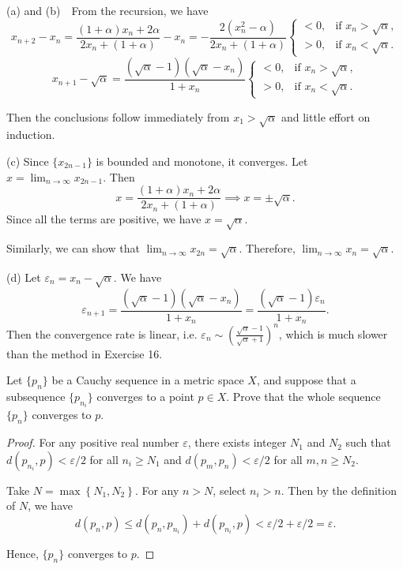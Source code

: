 \documentclass{article}
\begin{document}
\begin{solution}
	(a) and (b)\ \ From the recursion, we have
	\[ x_{n+2}-x_{n}=\frac{(1+\alpha)x_{n}+2\alpha}{2x_n+(1+\alpha)}-x_n=-\frac{2(x_n^2-\alpha)}{2x_n+(1+\alpha)}\begin{cases}
		<0, & \text{if } x_n>\sqrt{\alpha},\\
		>0, & \text{if } x_n<\sqrt{\alpha}.
	\end{cases} \]
	\[ x_{n+1}-\sqrt{\alpha}=\frac{(\sqrt{\alpha}-1)(\sqrt{\alpha}-x_n)}{1+x_n}\begin{cases}
		<0, & \text{if } x_n>\sqrt{\alpha},\\
		>0, & \text{if } x_n<\sqrt{\alpha}.
	\end{cases} \] \par
	Then the conclusions follow immediately from \( x_1>\sqrt{\alpha} \) and little effort on induction.\par
	(c) Since \( \{x_{2n-1}\} \) is bounded and monotone, it converges. Let \( x=\lim_{n\to\infty} x_{2n-1} \). Then
	\[ x=\frac{(1+\alpha)x_{n}+2\alpha}{2x_n+(1+\alpha)} \implies x=\pm\sqrt{\alpha}. \] 
	Since all the terms are positive, we have \( x=\sqrt{\alpha} \).\par
	Similarly, we can show that \( \lim_{n\to\infty} x_{2n}=\sqrt{\alpha} \). Therefore, \( \lim_{n\to\infty} x_n=\sqrt{\alpha} \).\par
	(d) Let \( \varepsilon_n=x_n-\sqrt{\alpha} \). We have
	\[ \varepsilon_{n+1}=\frac{(\sqrt{\alpha}-1)(\sqrt{\alpha}-x_n)}{1+x_n}=\frac{(\sqrt{\alpha}-1)\varepsilon_n}{1+x_n}. \] 
	Then the convergence rate is linear, i.e. \( \varepsilon_n\sim \left(\frac{\sqrt{\alpha}-1}{\sqrt{\alpha}+1}\right)^n \), which is much slower than the method in Exercise 16.
\end{solution}

\begin{problem}[3-20]
Let $\{p_n\}$ be a Cauchy sequence in a metric space $X$, and suppose that a subsequence $\{p_{n_i}\}$ converges to a point $p\in X$. Prove that the whole sequence $\{p_n\}$ converges to $p$.
\end{problem}

\begin{proof}
	For any positive real number \( \varepsilon \), there exists integer \( N_1 \) and \( N_2 \) such that \( d(p_{n_i},p)<\varepsilon/2 \) for all \( n_i\geq N_1 \) and \( d(p_m,p_n)<\varepsilon/2 \) for all \( m,n\geq N_2 \).\par
	Take \( N=\max \left\{N_1,N_2\right\} \). For any \( n>N \), select \( n_i>n \). Then by the definition of \( N \), we have
	\[ d(p_n,p)\le d(p_n,p_{n_i})+d(p_{n_i},p)<\varepsilon/2+\varepsilon/2 =\varepsilon. \] \par
	Hence, \( \{p_n\} \) converges to \( p \).
\end{proof}
\end{document}
